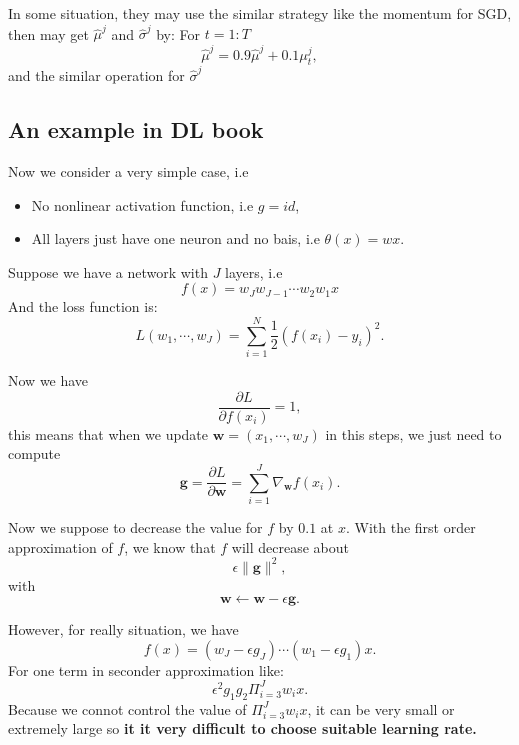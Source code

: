 In some situation, they may use the similar strategy like the momentum for SGD, then may get $\hat \mu^j$ and $\hat \sigma^j$ by: For $t= 1 :T$
\begin{equation}
\hat \mu^j = 0.9 \hat \mu^j + 0.1 \mu^j_t,
\end{equation}
and the similar operation for $\hat \sigma^j$

\subsection{An example in DL book}
Now we consider a very simple case, i.e
\begin{itemize}
\item No nonlinear activation function, i.e $g = id$,
\item All layers just have one neuron and no bais, i.e $\theta(x) = wx$.
\end{itemize}
Suppose we have a network with $J$ layers, i.e
\begin{equation}
f(x) = w_J w_{J-1} \cdots w_2 w_1 x
\end{equation}
And the loss function is:
\begin{equation}
L(w_1, \cdots, w_J) = \sum_{i = 1}^N\frac{1}{2} (f(x_i) - y_i)^2.
\end{equation}

Now we have
\begin{equation}
\frac{\partial L}{\partial f(x_i)} = 1,
\end{equation}
this means that when we update $\bm{w} = (x_1, \cdots, w_J)$ in this steps, we just need to compute
\begin{equation}
\bm{g} = \frac{\partial L}{\partial \bm{w}} = \sum_{i=1}^J \nabla_{\bm{w}} f(x_i).
\end{equation}

Now we suppose to decrease the value for $f$ by $0.1$ at $x$. With the first order approximation of $f$, we know that $f$ will decrease about
\begin{equation}
\epsilon \|\bm{g}\|^2,
\end{equation}
with
\begin{equation}
\bm{w} \leftarrow \bm{w} - \epsilon \bm{g}.
\end{equation}

However, for really situation, we have
\begin{equation}
f(x) = (w_J - \epsilon g_J)\cdots(w_1 - \epsilon g_1)x.
\end{equation}
For one term in seconder approximation like:
\begin{equation}
\epsilon^2 g_1 g_2 \Pi_{i=3}^J w_i x.
\end{equation}
Because we connot control the value of $\Pi_{i=3}^J w_i x$, it can be very small or extremely large so {\bf it it very difficult to choose suitable learning rate.}

